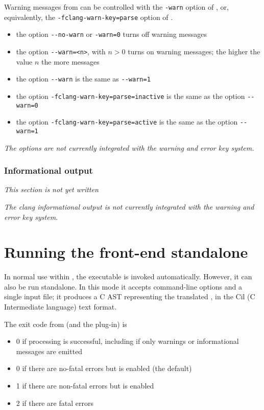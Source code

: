 Warning messages from \irg can be controlled with the \lstinline|-warn| option of \irg, or, equivalently, the \lstinline|-fclang-warn-key=parse| option of \fc.

\begin{itemize}
\item the \irg option \lstinline|--no-warn| or \lstinline|-warn=0| turns off \irg warning messages
\item the \irg option \lstinline|--warn=<n>|, with $n > 0$ turns on \irg warning messages; the higher the value $n$ the more messages
\item the \irg option \lstinline|--warn| is the same as \lstinline|--warn=1|
\item the \fc option \lstinline|-fclang-warn-key=parse=inactive| is the same as the \irg option  \lstinline|--warn=0|
\item the \fc option \lstinline|-fclang-warn-key=parse=active| is the same as the \irg option  \lstinline|--warn=1|
\end{itemize}

\textit{The \clang options are not currently integrated with the \fc warning and error key system.}

\subsection{Informational output}

\textit{This section is not yet written}

\textit{The clang informational output is not currently integrated with the \fc warning and error key system.}

\chapter{Running the \fclang front-end standalone}
\label{sec:standalone}

In normal use within \framac, the \irg executable is
invoked automatically. However, it can also be run standalone.
In this mode it accepts command-line options and a single input file;
it produces a C AST representing the translated \cpp, in the Cil (C Intermediate language) text format.

The exit code from \irg (and the \fclang plug-in) is
\begin{itemize}
\item 0 if processing is successful, including if only warnings or informational messages are emitted
\item 0 if there are no-fatal errors but  is enabled (the default)
\item 1 if there are non-fatal errors but  is enabled
\item 2 if there are fatal errors
\end{itemize}


